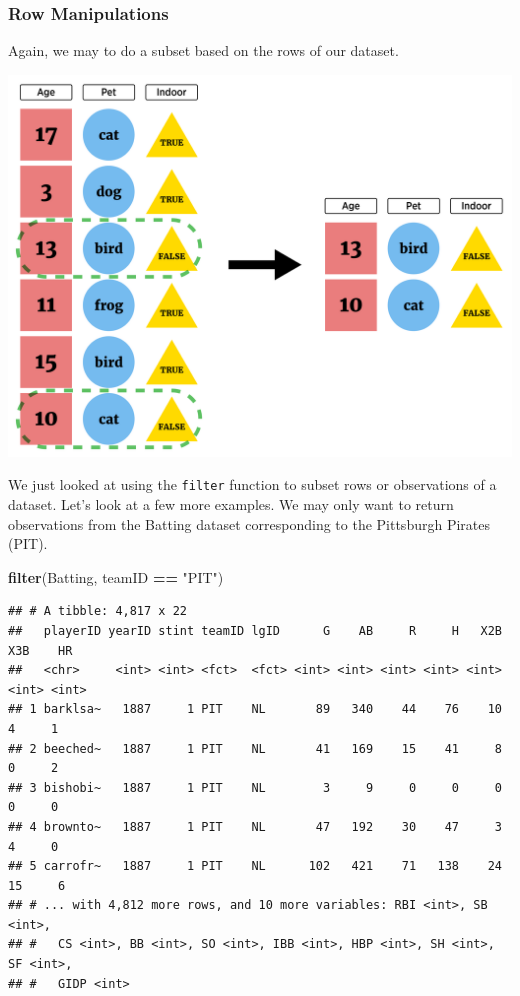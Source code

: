 \documentclass[
]{book}
\newenvironment{Shaded}{\begin{snugshade}}{\end{snugshade}}
\newcommand{\KeywordTok}[1]{\textcolor[rgb]{0.13,0.29,0.53}{\textbf{#1}}}
\newcommand{\NormalTok}[1]{#1}
\newcommand{\OperatorTok}[1]{\textcolor[rgb]{0.81,0.36,0.00}{\textbf{#1}}}
\newcommand{\StringTok}[1]{\textcolor[rgb]{0.31,0.60,0.02}{#1}}
\theoremstyle{definition}
\theoremstyle{definition}
\theoremstyle{definition}
\theoremstyle{remark}
\begin{document}
\hypertarget{row-manipulations}{%
\subsubsection{Row Manipulations}\label{row-manipulations}}

Again, we may to do a subset based on the rows of our dataset.

\begin{center}\includegraphics[width=0.8\linewidth]{img/filterVisualF} \end{center}

We just looked at using the \texttt{filter} function to subset rows or observations of a dataset. Let's look at a few more examples. We may only want to return observations from the Batting dataset corresponding to the Pittsburgh Pirates (PIT).

\begin{Shaded}
\begin{Highlighting}[]
\KeywordTok{filter}\NormalTok{(Batting, teamID }\OperatorTok{==}\StringTok{ "PIT"}\NormalTok{)}
\end{Highlighting}
\end{Shaded}

\begin{verbatim}
## # A tibble: 4,817 x 22
##   playerID yearID stint teamID lgID      G    AB     R     H   X2B   X3B    HR
##   <chr>     <int> <int> <fct>  <fct> <int> <int> <int> <int> <int> <int> <int>
## 1 barklsa~   1887     1 PIT    NL       89   340    44    76    10     4     1
## 2 beeched~   1887     1 PIT    NL       41   169    15    41     8     0     2
## 3 bishobi~   1887     1 PIT    NL        3     9     0     0     0     0     0
## 4 brownto~   1887     1 PIT    NL       47   192    30    47     3     4     0
## 5 carrofr~   1887     1 PIT    NL      102   421    71   138    24    15     6
## # ... with 4,812 more rows, and 10 more variables: RBI <int>, SB <int>,
## #   CS <int>, BB <int>, SO <int>, IBB <int>, HBP <int>, SH <int>, SF <int>,
## #   GIDP <int>
\end{verbatim}
\end{document}
